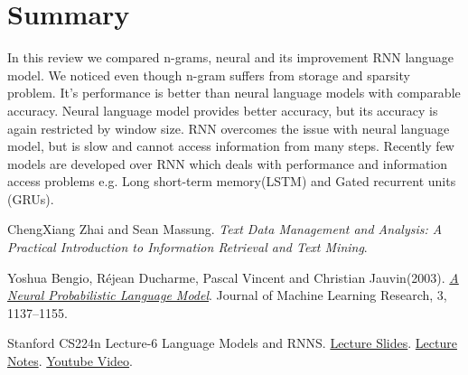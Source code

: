 \documentclass[letterpaper]{article}
\begin{document}
\section{Summary}
In this review we compared n-grams, neural and its improvement RNN language model.
We noticed even though n-gram suffers from storage and sparsity problem. It's performance
is better than neural language models with comparable accuracy. Neural language model
provides better accuracy, but its accuracy is again restricted by window size. RNN overcomes
the issue with neural language model, but is slow and cannot access information from
many steps. Recently few models are developed over RNN which deals with performance and information
access problems e.g. Long short-term memory(LSTM) and Gated recurrent units (GRUs).

\begin{thebibliography}{9}
	ChengXiang Zhai and Sean Massung.
	\textit{Text Data Management and Analysis: A Practical Introduction to Information Retrieval and Text Mining}. 
	
	Yoshua Bengio, Réjean Ducharme, Pascal Vincent and Christian Jauvin(2003).
	\href{https://www.jmlr.org/papers/volume3/bengio03a/bengio03a.pdf}{\textit{A Neural Probabilistic Language Model}}.
	Journal of Machine Learning Research, 3, 1137–1155.
	
	Stanford CS224n Lecture-6 Language Models and RNNS.
	\href{http://www.cs.umd.edu/class/fall2016/cmsc723/slides/slides_08.pdf}{Lecture Slides}.
	\href{http://web.stanford.edu/class/cs224n/readings/cs224n-2019-notes05-LM_RNN.pdf}{Lecture Notes}.
	\href{https://www.youtube.com/watch?v=iWea12EAu6U}{Youtube Video}.
\end{thebibliography}
\end{document}
